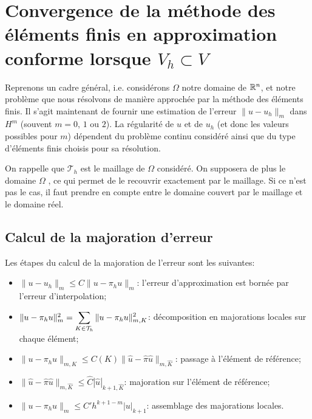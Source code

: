 \medskip
\section[Convergence de la méthode des éléments finis en approximation conforme]{Convergence de la méthode des éléments finis en approximation conforme lorsque $V_h\subset V$}

Reprenons un cadre général, i.e. considérons $\Omega$ notre domaine de $\mathbb R^n$, et notre problème que nous résolvons de manière approchée par la méthode des éléments finis. Il s'agit maintenant de fournir une estimation de l'erreur $\|u-u_h\|_m$ dans $H^m$ (souvent $m = 0$, $1$ ou $2$). La régularité de $u$ et de $u_h$ (et donc les valeurs possibles pour $m$) dépendent du problème continu considéré ainsi que du type d'éléments finis choisis pour sa résolution.

\medskip
On rappelle que $\mathcal{T}_h$ est le maillage de $\Omega$ considéré. On supposera de plus le domaine $\Omega$ , ce qui permet de le recouvrir exactement par le maillage. Si ce n'est pas le cas, il faut prendre en compte  entre le domaine couvert par le maillage et le domaine réel.


\medskip
\subsection{Calcul de la majoration d'erreur}

Les étapes du calcul de la majoration de l'erreur sont les suivantes:
\begin{itemize}
  \item $\|u-u_h\|_m\le C\|u-\pi_hu\|_m$: l'erreur d'approximation est bornée par l'erreur
	d'interpolation;
  \item $\|u-\pi_hu\|^2_m=\displaystyle\sum_{K\in\mathcal{T}_h}\|u-\pi_hu\|^2_{m,K}$:
	décomposition en majorations locales sur chaque élément;
  \item $\|u-\pi_hu\|_{m,K}\le C(K)\|\hat{u}-\hat{\pi}\hat{u}\|_{m,\hat{K}}$:
	passage à l'élément de référence;
  \item $\|\hat{u}-\hat{\pi}\hat{u}\|_{m,\hat{K}}\le \hat{C}|\hat{u}|_{k+1,\hat{K}}$:
	majoration sur l'élément de référence;
  \item $\|u-\pi_hu\|_m\le C'h^{k+1-m}|u|_{k+1}$:
	assemblage des majorations locales.
\end{itemize}

\medskip
